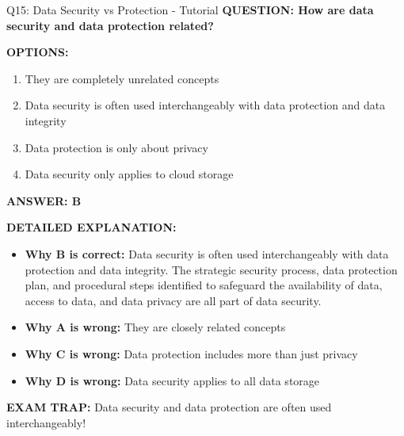 \documentclass[8pt]{beamer}
\begin{document}
	\begin{frame}{Q15: Data Security vs Protection - Tutorial}
		\fontsize{6.5}{7.5}\selectfont
		\textbf{QUESTION: How are data security and data protection related?}
		
		\vspace{0.1cm}
		\textbf{OPTIONS:}
		\begin{enumerate}
			\item They are completely unrelated concepts
			\item Data security is often used interchangeably with data protection and data integrity
			\item Data protection is only about privacy
			\item Data security only applies to cloud storage
		\end{enumerate}
		
		\vspace{0.1cm}
		\textcolor{myblue}{\textbf{ANSWER: B}}
		
		\vspace{0.1cm}
		\textbf{DETAILED EXPLANATION:}
		\begin{itemize}
			\item \textbf{Why B is correct:} Data security is often used interchangeably with data protection and data integrity. The strategic security process, data protection plan, and procedural steps identified to safeguard the availability of data, access to data, and data privacy are all part of data security.
			\item \textbf{Why A is wrong:} They are closely related concepts
			\item \textbf{Why C is wrong:} Data protection includes more than just privacy
			\item \textbf{Why D is wrong:} Data security applies to all data storage
		\end{itemize}
		
		\textcolor{myred}{\textbf{EXAM TRAP:}} Data security and data protection are \textcolor{myblue}{often used interchangeably}!
	\end{frame}
	
\end{document}
